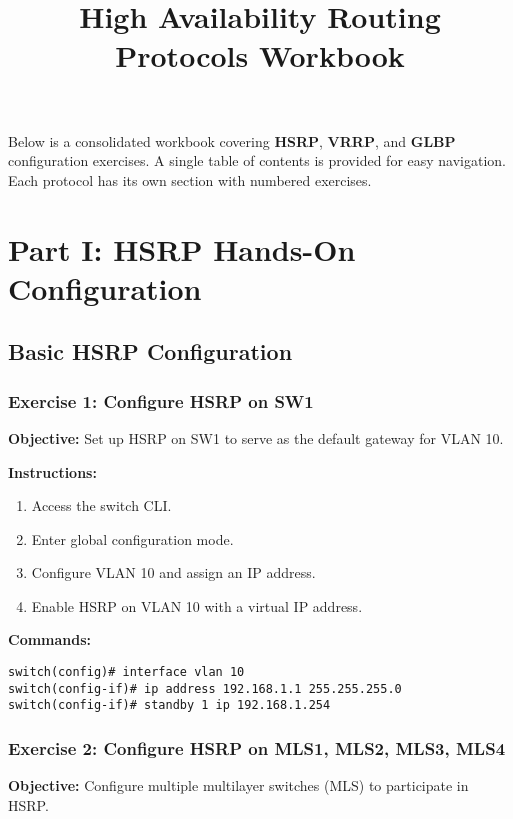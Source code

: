\documentclass[12pt]{article}
\begin{document}
\title{\textbf{High Availability Routing Protocols Workbook}}
\date{}
\maketitle

\noindent
Below is a consolidated workbook covering \textbf{HSRP}, \textbf{VRRP}, and \textbf{GLBP} configuration exercises. 
A single table of contents is provided for easy navigation. Each protocol has its own section with numbered exercises.

\tableofcontents
\newpage


\section{Part I: HSRP Hands-On Configuration}

\subsection{Basic HSRP Configuration}

\subsubsection*{Exercise 1: Configure HSRP on SW1}
\textbf{Objective:} Set up HSRP on SW1 to serve as the default gateway for VLAN 10.

\textbf{Instructions:}
\begin{enumerate}
\item Access the switch CLI.
\item Enter global configuration mode.
\item Configure VLAN 10 and assign an IP address.
\item Enable HSRP on VLAN 10 with a virtual IP address.
\end{enumerate}

\textbf{Commands:}
\begin{lstlisting}[style=CiscoCLI]
switch(config)# interface vlan 10
switch(config-if)# ip address 192.168.1.1 255.255.255.0
switch(config-if)# standby 1 ip 192.168.1.254
\end{lstlisting}

\bigskip

\subsubsection*{Exercise 2: Configure HSRP on MLS1, MLS2, MLS3, MLS4}
\textbf{Objective:} Configure multiple multilayer switches (MLS) to participate in HSRP.
\end{document}
